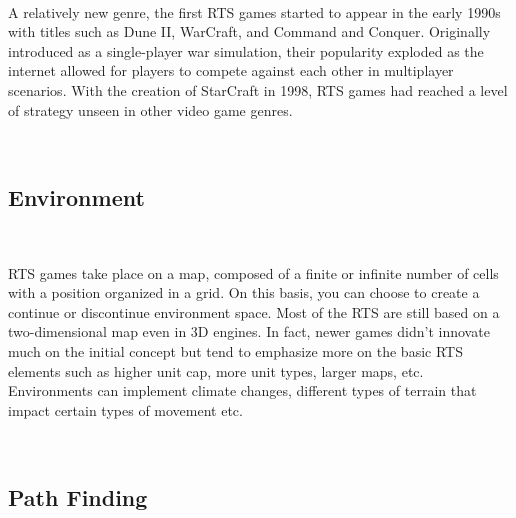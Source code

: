 \documentclass[a4paper,10pt]{book}
\begin{document}
~

A relatively new genre, the first RTS games started to appear
in  the  early  1990s  with  titles  such  as  Dune  II,  
WarCraft,  and Command and Conquer.   Originally introduced
as a single-player war simulation, their popularity exploded
as the internet allowed for players to compete against each
other in multiplayer scenarios. With the creation of StarCraft
in 1998, RTS games had reached a level of strategy unseen
in other video game genres.

~

\subsection{Environment}

~

RTS games take place on a map, composed of a finite or infinite number of cells with a position organized in a grid. On this basis,
you can choose to create a continue or discontinue environment space. Most of the RTS are still based on a two-dimensional map even 
in 3D engines. In fact, newer games didn't innovate much on the initial concept but tend to emphasize more on the basic RTS elements
such as higher unit cap, more unit types, larger maps, etc.
Environments can implement climate changes, different types of terrain that impact certain types of movement etc.

~


\subsection{Path Finding}

~
\end{document}
